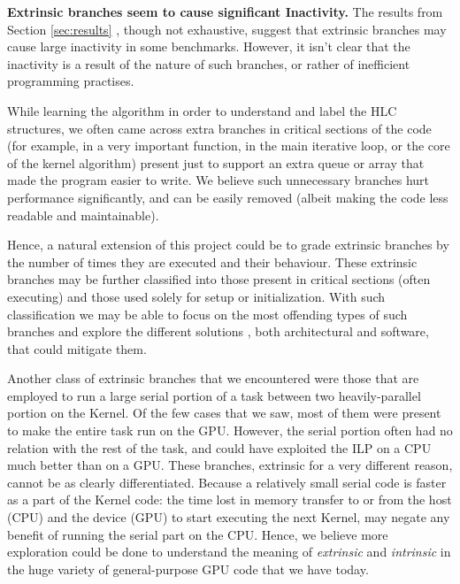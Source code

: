 

\label{sec:conclusion}
\par{
\textbf {Extrinsic branches seem to cause significant Inactivity.} The results from Section \ref{sec:results}
, though not exhaustive, suggest that extrinsic branches may cause large inactivity in some benchmarks. However, it isn't clear
that the inactivity is a result of the nature of such branches, or rather of inefficient programming
practises. 

While learning the algorithm in order to understand and label the HLC structures, we often
came across extra branches in critical sections of the code (for example, in a very important function, 
in the main iterative loop, or the core of the kernel algorithm) present just to support an extra queue
or array that made the program easier to write. We believe such unnecessary branches hurt performance
significantly, and can be easily removed (albeit making the code less readable and maintainable). 

Hence, a natural extension of this project could be to grade extrinsic branches by the number of times they are 
executed and their behaviour. These extrinsic branches may be further classified into those present in
critical sections (often executing) and those used solely for setup or initialization. With such 
classification we may be able to focus on the most offending types of such branches and explore the different solutions
, both architectural and software, that could mitigate them.

Another class of extrinsic branches that we encountered were those that are employed to run a large serial
portion of a task between two heavily-parallel portion on the Kernel. Of the few cases that we saw, most of
them were present to make the entire task run on the GPU. However, the serial portion often had no relation with
the rest of the task, and could have exploited the ILP on a CPU much better than on a GPU. These branches,
extrinsic for a very different reason, cannot be as clearly differentiated. Because a relatively small 
serial code is faster as a part of the Kernel code: the time lost in memory transfer to or from the host (CPU)
and the device (GPU) to start executing the next Kernel, may negate any benefit of running the serial part on the CPU.
Hence, we believe more exploration could be done to understand the meaning of \textsl{extrinsic} and \textsl{intrinsic}
in the huge variety of general-purpose GPU code that we have today.
}
